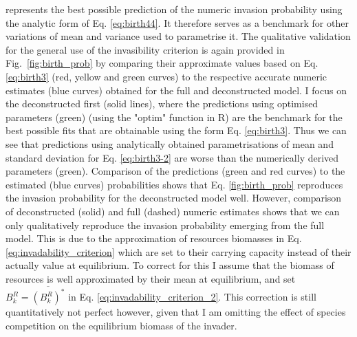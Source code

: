 \documentclass[a4paper]{report}
\begin{document}
{represents the best possible prediction of the numeric invasion probability using the analytic form of Eq. \eqref{eq:birth44}. It therefore serves as a benchmark for other variations of mean and variance used to parametrise it. The qualitative validation for the general use of the invasibility criterion is again provided in Fig.~\ref{fig:birth_prob} by comparing their approximate values based on Eq. \eqref{eq:birth3} (red, yellow and green curves) to the respective accurate numeric estimates (blue curves) obtained for the full and deconstructed model. I focus on the deconstructed first (solid lines), where the predictions using optimised  parameters (green) (using the "optim" function in R) are the benchmark for the best possible fits that are obtainable using the form Eq. \eqref{eq:birth3}. Thus we can see that predictions using analytically obtained parametrisations of mean and standard deviation for Eq. \eqref{eq:birth3-2} are worse than the numerically derived parameters (green). Comparison of the predictions (green and red curves) to the estimated (blue curves) probabilities shows that Eq. \ref{fig:birth_prob} reproduces the invasion probability for the deconstructed model well. However, comparison of deconstructed (solid) and full (dashed) numeric estimates shows that we can only qualitatively reproduce the invasion probability emerging from the full model. This is due to the approximation of  resources biomasses in Eq. \eqref{eq:invadability_criterion} which are set to their carrying capacity instead of their actually value at equilibrium. To correct for this I  assume that the biomass of resources is well approximated by their mean at equilibrium, and set $B^R_k=\overline{(B^R_k)^*}$ in Eq. \eqref{eq:invadability_criterion_2}. This correction is still quantitatively not perfect however, given that I am omitting the effect of species competition on the equilibrium biomass of the invader. 

}
\end{document}
